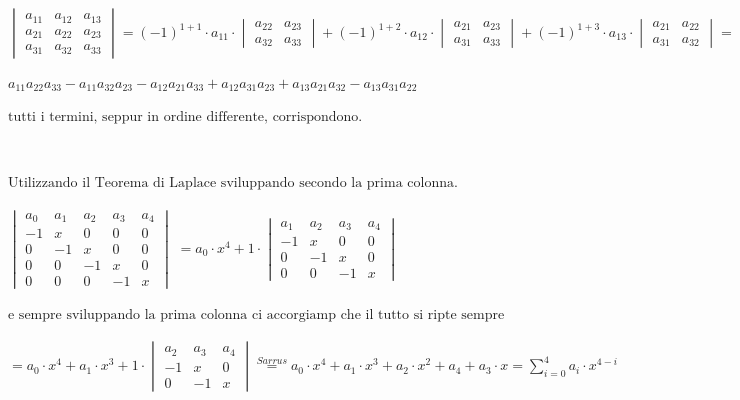 \documentclass[a4paper,10pt]{article}
\begin{document}
${{\begin{vmatrix}
a_{11} & a_{12} & a_{13} \\
a_{21} & a_{22} & a_{23} \\
a_{31} & a_{32} & a_{33}
\end{vmatrix}}= (-1)^{1+1}\cdot a_{11} \cdot 
\begin{vmatrix}
a_{22} & a_{23}\\
a_{32} & a_{33}
\end{vmatrix}
+ (-1)^{1+2} \cdot a_{12} \cdot 
\begin{vmatrix}
a_{21} & a_{23} \\
a_{31} & a_ {33}
\end{vmatrix}
+ (-1)^{1+3} \cdot a_{13} \cdot 
\begin{vmatrix}
a_{21} & a_{22} \\
a_{31} & a_{32}
\end{vmatrix}=}$ 
\\
\\
$a_{11}a_{22}a_{33} - a_{11}a_{32}a_{23} - a_{12}a_{21}a_{33} + a_{12}a_{31}a_{23} + a_{13}a_{21}a_{32} - a_{13}a_{31}a_{22}$
\\
\\
 $\text{tutti i termini, seppur in ordine differente, corrispondono.}$



\pagebreak


 \\\\
   $\text{Utilizzando il Teorema di Laplace sviluppando secondo la prima colonna.}$
\\
\\
 $\begin{vmatrix}
 a_0 & a_1 & a_2 & a_3 & a_4 \\
 -1 & x & 0 & 0 & 0 \\
 0 & -1 & x & 0 & 0 \\
 0 & 0 & -1 & x & 0 \\
 0 & 0 & 0 & -1 & x
 \end{vmatrix}$
 $ = a_0 \cdot x^4 + 1 \cdot 
 \begin{vmatrix}
 a_1 & a_2 & a_3 & a_4\\ 
 -1 & x & 0 & 0 \\
 0 & -1 & x & 0 \\
 0 & 0 & -1 & x
 \end{vmatrix}$
 \\
 \\
  $\text{e sempre sviluppando la prima colonna ci accorgiamp che il tutto si ripte sempre in modo analogo:}$
 \\
 \\
 ${= a_0 \cdot x^4 + a_1 \cdot x^3 + 1 \cdot 
  \begin{vmatrix}
 a_2 & a_3 & a_4\\
  -1 & x & 0\\
  0 & -1 & x
  \end{vmatrix}
\stackrel{Sarrus}{=} a_0 \cdot x^4 + a_1 \cdot x^3 + a_2 \cdot x^2 + a_4 + a_3 \cdot x =  	\sum_{i=0}^4 a_i \cdot x^{4-i}}$ 
\end{document}
